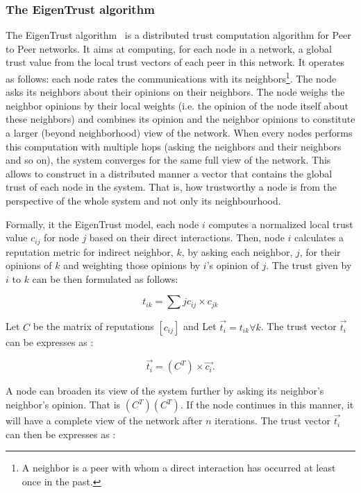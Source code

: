 \documentclass[]{article}
\begin{document}
\subsubsection{The EigenTrust algorithm}
The EigenTrust algorithm~\cite{kamvar2003eigentrust} is a distributed trust computation algorithm for Peer to Peer networks. It aims at computing, for each node in a network, a global trust value from the local trust vectors of each peer in this network. It operates as follows: each node rates the communications with its neighbors\footnote{A neighbor is a peer with whom a direct interaction has occurred at least once in the past.}. The node asks its neighbors about their opinions on their neighbors. The node weighs the neighbor opinions by their local weights (i.e. the opinion of the node itself about these neighbors) and combines its opinion and the neighbor opinions to constitute a larger (beyond neighborhood) view of the network. When every nodes performs this computation with multiple hops (asking the neighbors and their neighbors and so on), the system converges for the same full view of the network. This allows to construct in a distributed manner a vector that contains the global trust of each node in the system. That is, how trustworthy a node is from the perspective of the whole system and not only its neighbourhood.

 Formally, it the EigenTrust model, each node $i$ computes a normalized local trust value $c_{ij}$ for node $j$ based on their direct interactions. Then, node $i$ calculates a reputation metric for indirect neighbor, $k$, by asking each neighbor, $j$, for their opinions of $k$ and weighting those opinions by $i$’s opinion of $j$. The trust given by $i$ to $k$ can be then formulated as follows: 

\begin{equation}
 t_{ik} = \sum{j} c_{ij}\times c_{jk}
\end{equation}

Let $C$ be the matrix of reputations $[c_{ij}]$ and Let $\vec{t_i} = t_{ik} \forall k$. The trust vector $\vec{t_i}$ can be expresses as : 

\begin{equation}
   \vec{t_i} = (C^T) \times \vec{c_i}. 
\end{equation}

A node can broaden its view of the system further by asking its neighbor’s neighbor’s opinion. That is $(C^T)(C^T)$. If the node continues in this manner, it will have a complete view of the network after
$n$ iterations. The trust vector $\vec{t_i}$ can then be expresses as : 
\end{document}
